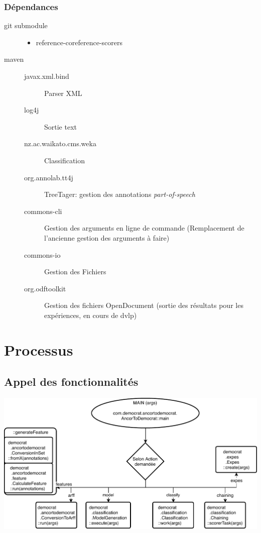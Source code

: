 \documentclass[a4paper,10pt]{report}
\begin{document}
 \subsection{Dépendances}
 \begin{description}
  \item [git submodule] \begin{itemize}
                         \item reference-coreference-scorers
                        \end{itemize}

  \item [maven] \begin{description}
                 \item [javax.xml.bind] Parser XML
                 \item [log4j] Sortie text
                 \item [nz.ac.waikato.cms.weka] Classification
                 \item [org.annolab.tt4j] TreeTager: gestion des annotations \emph{part-of-speech}
                 \item [commons-cli] Gestion des arguments en ligne de commande (Remplacement de l'ancienne gestion des arguments à faire)
                 \item [commons-io] Gestion des Fichiers
                 \item [org.odftoolkit] Gestion des fichiers OpenDocument (sortie des résultats pour les expériences, en cours de dvlp)
                 
                \end{description}
                

 \end{description}


 \pagebreak
 \chapter{Processus}
  \section{Appel des fonctionnalités}
  
    \noindent
    \includegraphics[width=\textwidth,keepaspectratio]{ancortodemocrat.pdf}  
  
\end{document}
